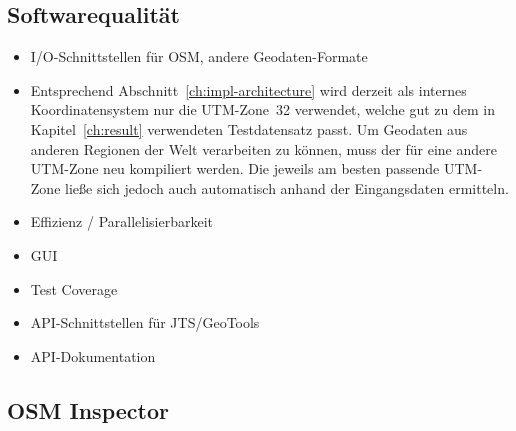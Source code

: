 \documentclass[../main/thesis.tex]{subfiles}
\begin{document}



\subsection{Softwarequalität}

\begin{itemize}
\item I/O-Schnittstellen für OSM, andere Geodaten-Formate
\item
Entsprechend Abschnitt~\ref{ch:impl-architecture} wird derzeit als internes Koordinatensystem nur die UTM-Zone~32 verwendet, welche gut zu dem in Kapitel~\ref{ch:result} verwendeten Testdatensatz passt.
Um Geodaten aus anderen Regionen der Welt verarbeiten zu können, muss der  für eine andere UTM-Zone neu kompiliert werden.
Die jeweils am besten passende UTM-Zone ließe sich jedoch auch automatisch anhand der Eingangsdaten ermitteln.
\item Effizienz / Parallelisierbarkeit
\item GUI
\item Test Coverage
\item API-Schnittstellen für JTS/GeoTools
\item API-Dokumentation
\end{itemize}




\subsection{OSM Inspector}
\end{document}

